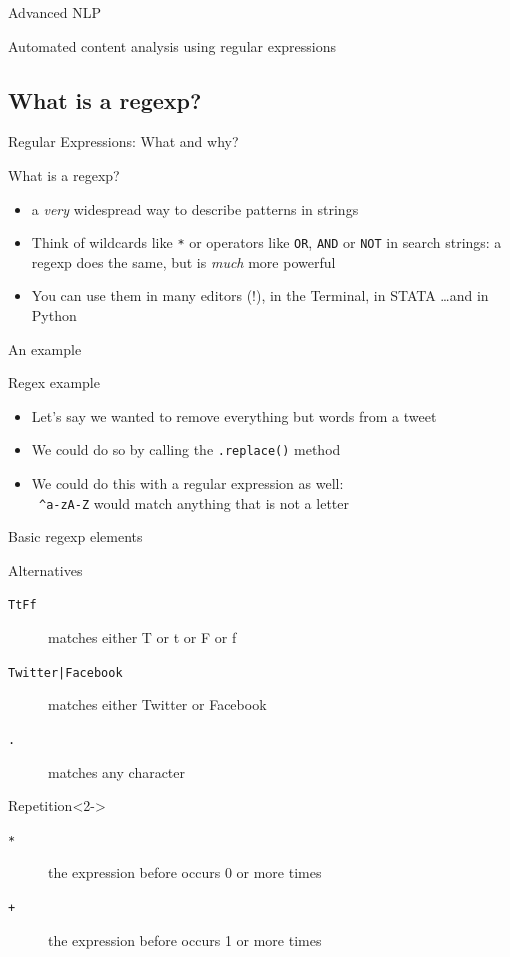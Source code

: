 \documentclass[handout]{beamer}
\begin{document}
\begin{section}{Advanced NLP}
\begin{frame}
Automated content analysis using regular expressions
\end{frame}


\subsection{What is a regexp?}
\begin{frame}{Regular Expressions: What and why?}
\begin{block}{What is a regexp?}
\begin{itemize}
\item<1-> a \emph{very} widespread way to describe patterns in strings
\item<2-> Think of wildcards like {\tt{*}} or operators like {\tt{OR}}, {\tt{AND}} or {\tt{NOT}} in search strings: a regexp does the same, but is \emph{much} more powerful
\item<3-> You can use them in many editors (!), in the Terminal, in STATA \ldots and in Python
\end{itemize}
\end{block}
\end{frame}

\begin{frame}{An example}
\begin{block}{Regex example}
\begin{itemize}
\item Let's say we wanted to remove everything but words from a tweet
\item We could do so by calling the \texttt{.replace()} method
\item We could do this with a regular expression as well: \\
{\tt{ \lbrack \^{}a-zA-Z\rbrack}} would match anything that is not a letter
\end{itemize}
\end{block}
\end{frame}

\begin{frame}{Basic regexp elements}
\begin{block}{Alternatives}
\begin{description}
\item[{\tt{\lbrack TtFf\rbrack}}] matches either T or t or F or f
\item[{\tt{Twitter|Facebook}}] matches either Twitter or Facebook
\item[{\tt{.}}] matches any character
\end{description}
\end{block}
\begin{block}{Repetition}<2->
\begin{description}
\item[{\tt{*}}] the expression before occurs 0 or more times
\item[{\tt{+}}] the expression before occurs 1 or more times
\end{description}
\end{block}
\end{frame}


\end{section}
\end{document}
